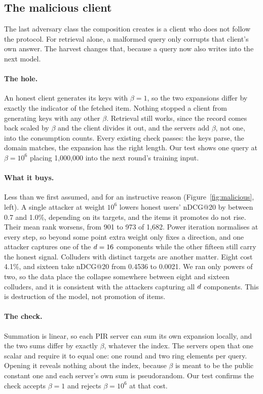 \subsection{The malicious client}
\label{sec:leak:malicious}

The last adversary class the composition creates is a client who does not follow
the protocol. For retrieval alone, a malformed query only corrupts that client's
own answer. The harvest changes that, because a query now also writes into the
next model.

\paragraph{The hole.} An honest client generates its keys with $\beta = 1$, so
the two expansions differ by exactly the indicator of the fetched item. Nothing
stopped a client from generating keys with any other $\beta$. Retrieval still
works, since the record comes back scaled by $\beta$ and the client divides it
out, and the servers add $\beta$, not one, into the consumption counts. Every
existing check passes: the keys parse, the domain matches, the expansion has the
right length. Our test shows one query at $\beta = 10^6$ placing 1{,}000{,}000
into the next round's training input.

\paragraph{What it buys.} Less than we first assumed, and for an instructive
reason (Figure~\ref{fig:malicious}, left). A single attacker at weight $10^6$
lowers honest users' nDCG@20 by between 0.7 and 1.0\%, depending on its targets,
and the items it promotes do not rise. Their mean rank worsens, from 901 to 973
of 1{,}682. Power iteration normalises at every step,
so beyond some point extra weight only fixes a direction, and one attacker
captures one of the $d = 16$ components while the other fifteen still carry
the honest signal. Colluders with distinct targets are another matter. Eight cost
4.1\%, and sixteen take nDCG@20 from 0.4536 to 0.0021. We ran only powers of two,
so the data place the collapse somewhere between eight and sixteen colluders,
and it is consistent with the attackers capturing all $d$ components. This is
destruction of the model, not promotion of items.

\paragraph{The check.} Summation is linear, so each PIR server can sum its own
expansion locally, and the two sums differ by exactly $\beta$, whatever the index.
The servers open that one scalar and require it to equal one: one round and two
ring elements per query. Opening it reveals nothing about the index, because
$\beta$ is meant to be the public constant one and each server's own sum is
pseudorandom. Our test confirms the check accepts $\beta = 1$ and rejects
$\beta = 10^6$ at that cost.

